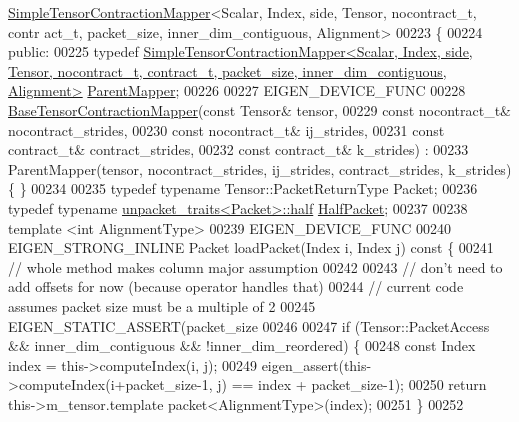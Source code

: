 \begin{DoxyCode}
      \hyperlink{class_eigen_1_1internal_1_1_simple_tensor_contraction_mapper}{SimpleTensorContractionMapper}<Scalar, Index, side, Tensor, nocontract\_t, contr
      act\_t, packet\_size, inner\_dim\_contiguous, Alignment>
00223 \{
00224  \textcolor{keyword}{public}:
00225   \textcolor{keyword}{typedef} 
      \hyperlink{class_eigen_1_1internal_1_1_simple_tensor_contraction_mapper}{SimpleTensorContractionMapper<Scalar, Index, side, Tensor, nocontract\_t, contract\_t, packet\_size,
       inner\_dim\_contiguous, Alignment>}
       \hyperlink{class_eigen_1_1internal_1_1_simple_tensor_contraction_mapper}{ParentMapper};
00226 
00227   EIGEN\_DEVICE\_FUNC
00228   \hyperlink{class_eigen_1_1internal_1_1_base_tensor_contraction_mapper}{BaseTensorContractionMapper}(\textcolor{keyword}{const} Tensor& tensor,
00229                               \textcolor{keyword}{const} nocontract\_t& nocontract\_strides,
00230                               \textcolor{keyword}{const} nocontract\_t& ij\_strides,
00231                               \textcolor{keyword}{const} contract\_t& contract\_strides,
00232                               \textcolor{keyword}{const} contract\_t& k\_strides) :
00233   ParentMapper(tensor, nocontract\_strides, ij\_strides, contract\_strides, k\_strides) \{ \}
00234 
00235   \textcolor{keyword}{typedef} \textcolor{keyword}{typename} Tensor::PacketReturnType Packet;
00236   \textcolor{keyword}{typedef} \textcolor{keyword}{typename} \hyperlink{union_eigen_1_1internal_1_1_packet}{unpacket\_traits<Packet>::half} 
      \hyperlink{union_eigen_1_1internal_1_1_packet}{HalfPacket};
00237 
00238   \textcolor{keyword}{template} <\textcolor{keywordtype}{int} AlignmentType>
00239   EIGEN\_DEVICE\_FUNC
00240   EIGEN\_STRONG\_INLINE Packet loadPacket(Index i, Index j)\textcolor{keyword}{ const }\{
00241     \textcolor{comment}{// whole method makes column major assumption}
00242 
00243     \textcolor{comment}{// don't need to add offsets for now (because operator handles that)}
00244     \textcolor{comment}{// current code assumes packet size must be a multiple of 2}
00245     EIGEN\_STATIC\_ASSERT(packet\_size %
00246 
00247     \textcolor{keywordflow}{if} (Tensor::PacketAccess && inner\_dim\_contiguous && !inner\_dim\_reordered) \{
00248       \textcolor{keyword}{const} Index index = this->computeIndex(i, j);
00249       eigen\_assert(this->computeIndex(i+packet\_size-1, j) == index + packet\_size-1);
00250       \textcolor{keywordflow}{return} this->m\_tensor.template packet<AlignmentType>(index);
00251     \}
00252 

\end{DoxyCode}
